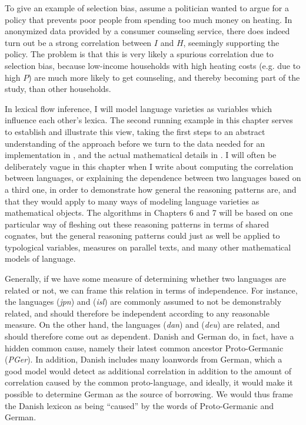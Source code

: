 To give an example of selection bias, assume a politician wanted to argue for a policy that prevents poor people from spending too much money on heating. In anonymized data provided by a consumer counseling service, there does indeed turn out be a strong correlation between $I$ and $H$, seemingly supporting the policy. The problem is that this is very likely a spurious correlation due to selection bias, because low-income households with high heating costs (e.g. due to high $P$) are much more likely to get counseling, and thereby becoming part of the study, than other households.

In lexical flow inference, I will model language varieties as variables which influence each other's lexica. The second running example in this chapter serves to establish and illustrate this view, taking the first steps to an abstract understanding of the approach before we turn to the data needed for an implementation in , and the actual mathematical details in . I will often be deliberately vague in this chapter when I write about computing the correlation between languages, or explaining the dependence between two languages based on a third one, in order to demonstrate how general the reasoning patterns are, and that they would apply to many ways of modeling language varieties as mathematical objects. The algorithms in Chapters 6 and 7 will be based on one particular way of fleshing out these reasoning patterns in terms of shared cognates, but the general reasoning patterns could just as well be applied to typological variables, measures on parallel texts, and many other mathematical 
models of language.

Generally, if we have some measure of determining whether two languages are related or not, we can frame this relation in terms of independence. For instance, the languages  (\textit{jpn}) and  (\textit{isl}) are commonly assumed to not be demonstrably related, and should therefore be independent according to any reasonable measure. On the other hand, the languages  (\textit{dan}) and  (\textit{deu}) are related, and should therefore come out as dependent. Danish and German do, in fact, have a hidden common cause, namely their latest common ancestor Proto-Germanic (\textit{PGer}). In addition, Danish includes many loanwords from German, which a good model would detect as additional correlation in addition to the amount of correlation caused by the common proto-language, and ideally, it would make it possible to determine German as the source of borrowing. We would thus frame the Danish lexicon as being ``caused'' by the words of Proto-Germanic and German.

